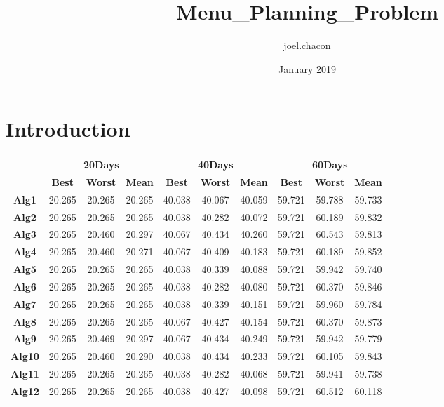 \documentclass{article}
\title{Menu_Planning_Problem}
\author{joel.chacon }
\date{January 2019}
\begin{document}
\maketitle

\section{Introduction}

\begin{table}[]
\begin{tabular}{c|c|c|c|c|c|c|c|c|c|}
\cline{2-10}
\textbf{} & \multicolumn{3}{c|}{\textbf{20Days}} & \multicolumn{3}{c|}{\textbf{40Days}} & \multicolumn{3}{c|}{\textbf{60Days}} \\ \cline{2-10} 
 & \textbf{Best} & \textbf{Worst} & \textbf{Mean} & \textbf{Best} & \textbf{Worst} & \textbf{Mean} & \textbf{Best} & \textbf{Worst} & \textbf{Mean} \\ \hline
\multicolumn{1}{|c|}{\textbf{Alg1}} & 20.265 & 20.265 & 20.265 & 40.038 & 40.067 & 40.059 & 59.721 & 59.788 & 59.733 \\ \hline
\multicolumn{1}{|c|}{\textbf{Alg2}} & 20.265 & 20.265 & 20.265 & 40.038 & 40.282 & 40.072 & 59.721 & 60.189 & 59.832 \\ \hline
\multicolumn{1}{|c|}{\textbf{Alg3}} & 20.265 & 20.460 & 20.297 & 40.067 & 40.434 & 40.260 & 59.721 & 60.543 & 59.813 \\ \hline
\multicolumn{1}{|c|}{\textbf{Alg4}} & 20.265 & 20.460 & 20.271 & 40.067 & 40.409 & 40.183 & 59.721 & 60.189 & 59.852 \\ \hline
\multicolumn{1}{|c|}{\textbf{Alg5}} & 20.265 & 20.265 & 20.265 & 40.038 & 40.339 & 40.088 & 59.721 & 59.942 & 59.740 \\ \hline
\multicolumn{1}{|c|}{\textbf{Alg6}} & 20.265 & 20.265 & 20.265 & 40.038 & 40.282 & 40.080 & 59.721 & 60.370 & 59.846 \\ \hline
\multicolumn{1}{|c|}{\textbf{Alg7}} & 20.265 & 20.265 & 20.265 & 40.038 & 40.339 & 40.151 & 59.721 & 59.960 & 59.784 \\ \hline
\multicolumn{1}{|c|}{\textbf{Alg8}} & 20.265 & 20.265 & 20.265 & 40.067 & 40.427 & 40.154 & 59.721 & 60.370 & 59.873 \\ \hline
\multicolumn{1}{|c|}{\textbf{Alg9}} & 20.265 & 20.469 & 20.297 & 40.067 & 40.434 & 40.249 & 59.721 & 59.942 & 59.779 \\ \hline
\multicolumn{1}{|c|}{\textbf{Alg10}} & 20.265 & 20.460 & 20.290 & 40.038 & 40.434 & 40.233 & 59.721 & 60.105 & 59.843 \\ \hline
\multicolumn{1}{|c|}{\textbf{Alg11}} & 20.265 & 20.265 & 20.265 & 40.038 & 40.282 & 40.068 & 59.721 & 59.941 & 59.738 \\ \hline
\multicolumn{1}{|c|}{\textbf{Alg12}} & 20.265 & 20.265 & 20.265 & 40.038 & 40.427 & 40.098 & 59.721 & 60.512 & 60.118 \\ \hline
\end{tabular}
\end{table}
\end{document}
